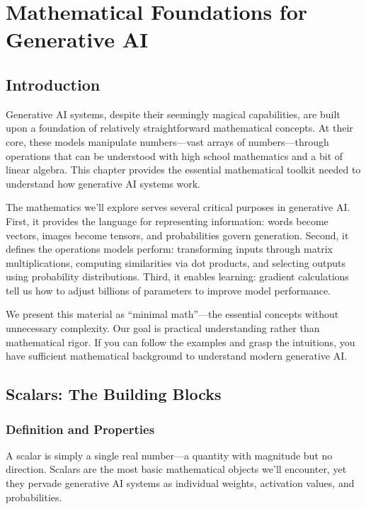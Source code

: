 \documentclass{book}
\begin{document}
\chapter{Mathematical Foundations for Generative AI}
\label{ch:minimal-math}

\section{Introduction}

Generative AI systems, despite their seemingly magical capabilities, are built upon a foundation of relatively straightforward mathematical concepts. At their core, these models manipulate numbers—vast arrays of numbers—through operations that can be understood with high school mathematics and a bit of linear algebra. This chapter provides the essential mathematical toolkit needed to understand how generative AI systems work.

The mathematics we'll explore serves several critical purposes in generative AI. First, it provides the language for representing information: words become vectors, images become tensors, and probabilities govern generation. Second, it defines the operations models perform: transforming inputs through matrix multiplications, computing similarities via dot products, and selecting outputs using probability distributions. Third, it enables learning: gradient calculations tell us how to adjust billions of parameters to improve model performance.

We present this material as ``minimal math''—the essential concepts without unnecessary complexity. Our goal is practical understanding rather than mathematical rigor. If you can follow the examples and grasp the intuitions, you have sufficient mathematical background to understand modern generative AI.

\section{Scalars: The Building Blocks}

\subsection{Definition and Properties}

A scalar is simply a single real number—a quantity with magnitude but no direction. Scalars are the most basic mathematical objects we'll encounter, yet they pervade generative AI systems as individual weights, activation values, and probabilities.
\end{document}
